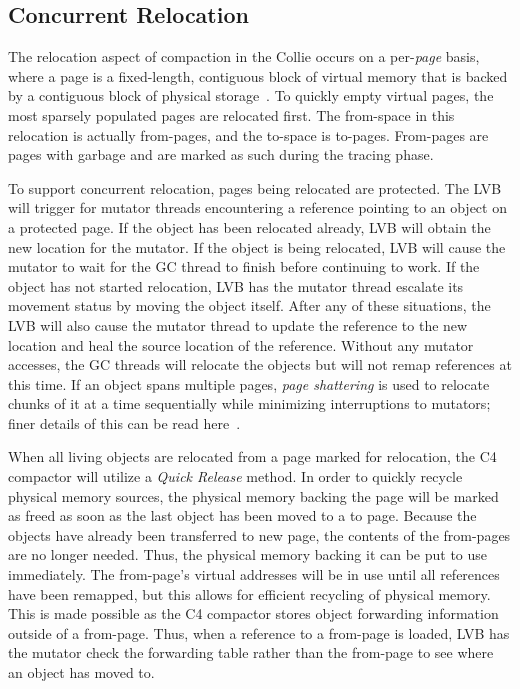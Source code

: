 \documentclass{sig-alternate}
\begin{document}
\subsection{Concurrent Relocation}
\label{sec:c4Relocation}

The relocation aspect of compaction in the Collie occurs on a per-\emph{page}
basis, where a page is a fixed-length, contiguous block of virtual memory
that is backed by a contiguous block of physical storage~\cite{wiki:page}\cite{Tene:C4}.
To quickly empty virtual pages, the most sparsely populated pages are relocated
first. The from-space in this relocation is actually from-pages, and the to-space
is to-pages. From-pages are pages with garbage
and are marked as such during the tracing phase.

To support concurrent relocation, pages being relocated are protected. 
The LVB will trigger for mutator threads encountering a reference pointing to an object
on a protected page. If the object has been relocated already, LVB will
obtain the new location for the mutator. If the object is being relocated, 
LVB will cause the mutator to wait
for the GC thread to finish before continuing to work.
If the object has not started relocation, LVB has the mutator thread 
escalate its movement status by moving the object itself. After any of 
these situations, the LVB will also cause the mutator thread to update 
the reference to the new location and heal the source location of the reference.
Without any mutator accesses, the GC threads will relocate the objects but
will not remap references at this time. If an object
spans multiple pages, \emph{page shattering} is used to relocate chunks of
it at a time sequentially while minimizing interruptions to mutators;
finer details of this can be read here~\cite{Tene:C4}.

When all living objects are relocated from a page marked for relocation,
the C4 compactor will utilize a \emph{Quick Release} method. In order to quickly recycle
physical memory sources, the physical memory backing the page will be marked as freed
as soon as the last object has been moved to a to page. Because the objects have already 
been transferred to new page, the contents of the from-pages are no longer needed. Thus,
the physical memory backing it can be put to use immediately. The from-page's virtual 
addresses will be in use until all references have been remapped, but this 
allows for efficient recycling of physical memory. This is made possible as the C4 compactor
stores object forwarding information outside of a from-page. Thus, when a reference to
a from-page is loaded, LVB has the mutator check the forwarding table rather than the
from-page to see where an object has moved to.
\end{document}
